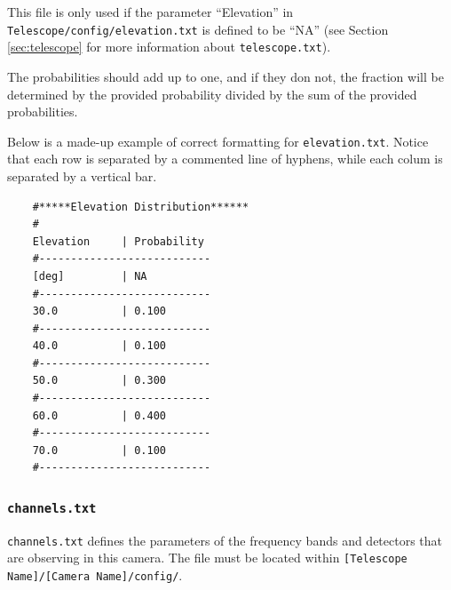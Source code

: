 \documentclass[11pt]{article} %
\begin{document}
This file is only used if the parameter ``Elevation'' in \texttt{Telescope/config/elevation.txt} is defined to be ``NA'' (see Section \ref{sec:telescope} for more information about \texttt{telescope.txt}).

The probabilities should add up to one, and if they don not, the fraction will be determined by the provided probability divided by the sum of the provided probabilities.

Below is a made-up example of correct formatting for \texttt{elevation.txt}. Notice that each row is separated by a commented line of hyphens, while each colum is separated by a vertical bar.

\begin{lstlisting}
	#*****Elevation Distribution******
	#
	Elevation     | Probability
	#---------------------------
	[deg]         | NA
	#---------------------------
	30.0          | 0.100
	#---------------------------
	40.0          | 0.100
	#---------------------------
	50.0          | 0.300
	#---------------------------
	60.0          | 0.400
	#---------------------------
	70.0          | 0.100
	#---------------------------
\end{lstlisting}


\subsubsection{\texttt{channels.txt}}

\texttt{channels.txt} defines the parameters of the frequency bands and detectors that are observing in this camera. The file must be located within \texttt{[Telescope Name]/[Camera Name]/config/}.
\end{document}
